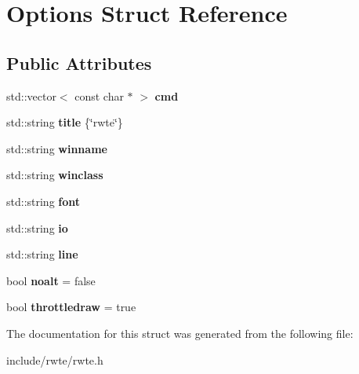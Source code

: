 \hypertarget{structOptions}{}\section{Options Struct Reference}
\label{structOptions}
\subsection*{Public Attributes}
\begin{DoxyCompactItemize}
\item 
\mbox{\label{structOptions_a67c30f50f3127e1ac9aa63f95450f984}} 
std\+::vector$<$ const char $\ast$ $>$ {\bfseries cmd}
\item 
\mbox{\label{structOptions_adabc7e7de78df5fbf61133728eb7dde6}} 
std\+::string {\bfseries title} \{\char`\"{}rwte\char`\"{}\}
\item 
\mbox{\label{structOptions_a3c13185351f5256c972783820c64a425}} 
std\+::string {\bfseries winname}
\item 
\mbox{\label{structOptions_a6d90fe2252a5696b414c25b5c93ae0c6}} 
std\+::string {\bfseries winclass}
\item 
\mbox{\label{structOptions_a97958eff4fbb8467596a6a003c845c1f}} 
std\+::string {\bfseries font}
\item 
\mbox{\label{structOptions_a674b9ea74cb87c17628628287af4e62c}} 
std\+::string {\bfseries io}
\item 
\mbox{\label{structOptions_a71009f064e3118eeeebf650e7abc0bd6}} 
std\+::string {\bfseries line}
\item 
\mbox{\label{structOptions_ab7efc3871ff83029e73a5abab52d1d6a}} 
bool {\bfseries noalt} = false
\item 
\mbox{\label{structOptions_a4ba04fe3e630e9450e969f16e7c988db}} 
bool {\bfseries throttledraw} = true
\end{DoxyCompactItemize}


The documentation for this struct was generated from the following file\+:\begin{DoxyCompactItemize}
\item 
include/rwte/rwte.\+h\end{DoxyCompactItemize}
